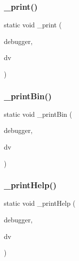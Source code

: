 \subsubsection{\texorpdfstring{\+\_\+print()}{\_print()}}
{\footnotesize\ttfamily static void \+\_\+print (\begin{DoxyParamCaption}\item[{struct C\+L\+I\+Debugger $\ast$}]{debugger,  }\item[{struct C\+L\+I\+Debug\+Vector $\ast$}]{dv }\end{DoxyParamCaption})\hspace{0.3cm}{\ttfamily [static]}}

\mbox{\label{debugger_2cli-debugger_8c_a50725d8ec0b31f2bcebf08ef23658a80}} 
\subsubsection{\texorpdfstring{\+\_\+print\+Bin()}{\_printBin()}}
{\footnotesize\ttfamily static void \+\_\+print\+Bin (\begin{DoxyParamCaption}\item[{struct C\+L\+I\+Debugger $\ast$}]{debugger,  }\item[{struct C\+L\+I\+Debug\+Vector $\ast$}]{dv }\end{DoxyParamCaption})\hspace{0.3cm}{\ttfamily [static]}}

\mbox{\label{debugger_2cli-debugger_8c_a3ed6b81951be65abc8107383fd7fe43e}} 
\subsubsection{\texorpdfstring{\+\_\+print\+Help()}{\_printHelp()}}
{\footnotesize\ttfamily static void \+\_\+print\+Help (\begin{DoxyParamCaption}\item[{struct C\+L\+I\+Debugger $\ast$}]{debugger,  }\item[{struct C\+L\+I\+Debug\+Vector $\ast$}]{dv }\end{DoxyParamCaption})\hspace{0.3cm}{\ttfamily [static]}}


